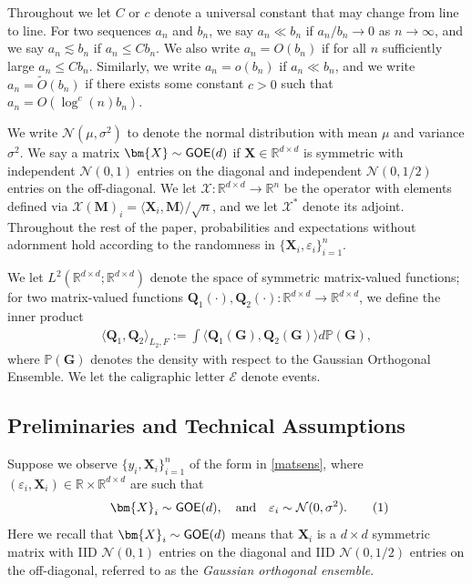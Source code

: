 \documentclass[10pt]{article}
\newcommand\numberthis{\addtocounter{equation}{1}\tag{\theequation}}
\newcommand{\eps}{\ensuremath{\varepsilon}}
\newcommand{\s}{^*}
\renewcommand{\tilde}{\widetilde}
\theoremstyle{definition}
\begin{document}
 Throughout we let $C$ or $c$ denote a universal constant that may change from line to line.  For two sequences $a_n$ and $b_n$, we say $a_n \ll b_n$ if $a_n/b_n \to 0$ as $n \to\infty$, and we say $a_n \lesssim b_n$ if $a_n \leq C b_n$.  We also write $a_n = O(b_n)$ if for all $n$ sufficiently large $a_n \leq C b_n$.  Similarly, we write $a_n = o(b_n)$ if $a_n \ll b_n$, and we write $a_n = \tilde O(b_n)$ if there exists some constant $c > 0$ such that $a_n = O( \log^c(n) b_n )$.  

We write $\mathcal{N}(\mu,\sigma^2)$ to denote the normal distribution with mean $\mu$ and variance $\sigma^2$.  We say a matrix $\bm{X} \sim {\sf GOE}(d)$ if $\bm{X} \in \mathbb{R}^{d\times d}$ is symmetric with independent $\mathcal{N}(0,1)$ entries on the diagonal and independent $\mathcal{N}(0,1/2)$ entries on the off-diagonal. 
We let $\mathcal{X}: \mathbb{R}^{d\times d} \to \mathbb{R}^{n}$ be the operator with elements defined via $\mathcal{X}(\bm{M})_i = \langle \bm{X}_i, \bm{M} \rangle/\sqrt{n}$, and we let $\mathcal{X}\s$ denote its adjoint.  Throughout the rest of the paper, probabilities and expectations without adornment hold according to the randomness in $\{\bm{X}_i,\eps_i\}_{i=1}^{n}$.  



We let $L^2(\mathbb{R}^{d \times d}; \mathbb{R}^{d\times d})$ denote the space of symmetric matrix-valued functions; for two matrix-valued functions $\bm{Q}_1(\cdot), \bm{Q}_2(\cdot): \mathbb{R}^{d\times d} \to \mathbb{R}^{d\times d}$, we define the inner product 
\begin{align}
    \langle \bm{Q}_1, \bm{Q}_2 \rangle_{L_2,F} := \int \langle \bm{Q}_1(\bm{G}), \bm{Q}_2(\bm{G}) \rangle d\mathbb{P}(\bm{G}),
\end{align}
where $\mathbb{P}(\bm{G})$ denotes the density with respect to the Gaussian Orthogonal Ensemble.  We let the caligraphic letter $\mathcal{E}$ denote events.    


\subsection{Preliminaries and Technical Assumptions}
\label{sec:prelims}
Suppose we observe $\{y_i,\bm{X}_i\}_{i=1}^{n}$ of the form in \eqref{matsens}, where $(\eps_i,\bm{X}_i) \in \mathbb{R} \times \mathbb{R}^{d\times d}$ are such that 
\begin{align}
     \qquad \bm{X}_i \sim {\sf GOE}(d), \quad \text{and}\quad \eps_i \sim \mathcal{N}(0,\sigma^2). \numberthis \label{model}
\end{align}
Here we recall that $\bm{X}_i \sim {\sf GOE}(d)$  means that $\bm{X}_i$ is a $d \times d$ symmetric matrix with IID $\mathcal{N}(0,1)$ entries on the diagonal and IID $\mathcal{N}(0,1/2)$ entries on the off-diagonal, referred to as the \emph{Gaussian orthogonal ensemble}.
\end{document}
